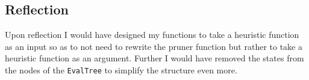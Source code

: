 \documentclass[11pt]{article}
\begin{document}
  \subsection{Reflection}
  Upon reflection I would have designed my functions to take a heuristic function as an input so as to not need to rewrite the pruner function but rather to take a heuristic function as an argument. Further I would have removed the states from the nodes of the \verb|EvalTree| to simplify the structure even more.





\end{document}
